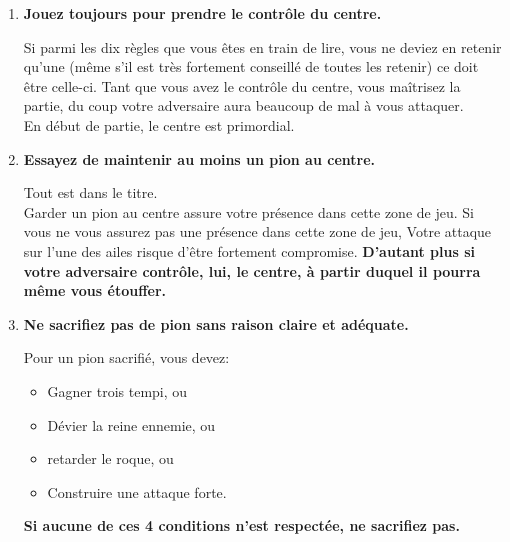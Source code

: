 \documentclass[a5paper,openany,twocolumn]{book}%
\begin{document}
\begin{enumerate}
\begin{center}
\end{center}



\item \qquad \textbf{Jouez toujours pour prendre le contrôle du centre.}

\medskip

\qquad Si parmi les dix règles que vous êtes en train de lire, vous ne deviez en retenir qu'une (même s'il est très fortement conseillé de toutes les retenir) ce doit être celle-ci. Tant que vous avez le contrôle du centre, vous ma\^{i}trisez la partie, du coup votre adversaire aura beaucoup de mal à vous attaquer.\\

\qquad En début de partie, le centre est primordial.


\item \qquad \textbf{Essayez de maintenir au moins un pion au centre.}

\medskip

\qquad Tout est dans le titre.\\

\qquad Garder un pion au centre assure votre présence dans cette zone de jeu. Si vous ne vous assurez pas une présence dans cette zone de jeu, Votre attaque sur l'une des ailes risque d'\^{e}tre fortement compromise.\textbf{ D'autant plus si votre adversaire contr\^{o}le, lui, le centre, \`{a} partir duquel il pourra m\^{e}me vous \'{e}touffer.}



\item \qquad \textbf{Ne sacrifiez pas de pion sans raison claire et ad\'{e}quate.} 

\medskip

\qquad Pour un pion sacrifi\'{e}, vous devez:

\medskip

\begin{itemize}

\item[\textbullet] Gagner trois tempi, ou
\item[\textbullet] D\'{e}vier la reine ennemie, ou
\item[\textbullet] retarder le roque, ou
\item[\textbullet] Construire une attaque forte.

\end{itemize}

\bigskip

\qquad \textbf{Si aucune de ces 4 conditions n'est respect\'{e}e, ne sacrifiez pas.}


\end{enumerate}
\end{document}
